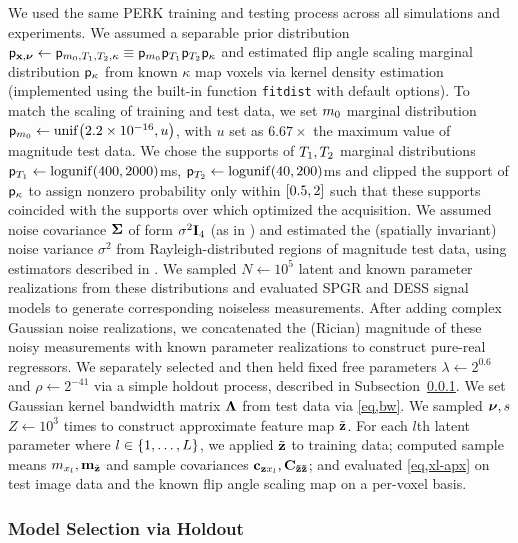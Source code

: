 We used the same PERK training and testing process
across all simulations and experiments.
We assumed a separable prior distribution
$\mathsf{p}_{\mathbf{x},\boldsymbol{\nu}} \gets \mathsf{p}_{m_0,T_1,T_2,\kappa} 
	\equiv \mathsf{p}_{m_0}\mathsf{p}_{T_1}\mathsf{p}_{T_2}\mathsf{p}_{\kappa}$
and estimated flip angle scaling marginal distribution $\mathsf{p}_{\kappa}$
from known $\kappa$ map voxels
via kernel density estimation 
(implemented using 
the built-in \matlab function \texttt{fitdist}
with default options).
To match the scaling of training and test data,
we set $m_0$ marginal distribution 
$\dist{\mzero} \gets \unif{2.2\times10^{-16},u}$,
with $u$ set as $6.67\times$ the maximum value
of magnitude test data.
We chose the supports 
of $T_1,T_2$ marginal distributions 
$\dist{\To} \gets \logunif{400,2000}$ms,
$\dist{\Tt} \gets \logunif{40,200}$ms
and clipped the support 
of $\mathsf{p}_{\kappa}$
to assign nonzero probability
only within $\brac{0.5,2}$
such that these supports 
coincided with the supports 
over which \cite{nataraj:17:oms} 
optimized the acquisition.
We assumed noise covariance $\boldsymbol{\Sigma}$ 
of form $\sigma^2 \mathbf{I}_{4}$ 
(as in \cite{nataraj:17:oms})
and estimated the 
(spatially invariant) noise variance $\sigma^2$
from Rayleigh-distributed regions 
of magnitude test data,
using estimators described in \cite{siddiqui:64:sif}.
We sampled $N \gets 10^5$ 
latent and known parameter realizations
from these distributions
and evaluated SPGR and DESS signal models
to generate corresponding noiseless measurements.
After adding complex Gaussian noise realizations,
we concatenated the (Rician) magnitude 
of these noisy measurements
with known parameter realizations
to construct pure-real regressors. 
We separately selected and then held fixed 
free parameters $\lambda \gets 2^{0.6}$ 
and $\rho \gets 2^{-41}$
via a simple holdout process,
described in Subsection~\ref{sss,perk,exp,meth,holdout}.
We set Gaussian kernel bandwidth matrix $\boldsymbol{\Lambda}$ 
from test data via \eqref{eq,bw}.
We sampled $\boldsymbol{\nu},s$ $Z \gets 10^3$ times 
to construct approximate feature map $\tilde{\mathbf{z}}$. 
For each $l$th latent parameter
where $l \in \set{1,\dots,L}$,
we applied $\tilde{\mathbf{z}}$ to training data;
computed sample means $m_{x_l}, \mathbf{m}_{\tilde{\mathbf{z}}}$ 
and sample covariances $\mathbf{c}_{\mathbf{z} x_l}, \mathbf{C_{\tilde{\mathbf{z}}\tilde{\mathbf{z}}}}$;
and evaluated \eqref{eq,xl-apx}
on test image data 
and the known flip angle scaling map
on a per-voxel basis. 

\subsubsection{Model Selection via Holdout}
\label{sss,perk,exp,meth,holdout}

